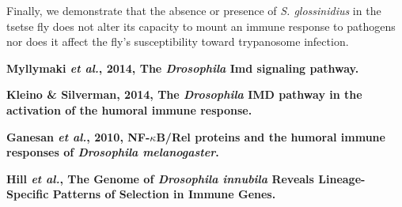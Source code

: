 \documentclass[11pt]{article}
\begin{document}
\begin{sloppypar}
Finally, we demonstrate that the absence or presence of \textit{S. glossinidius} in the tsetse fly does not alter its capacity to mount an immune response to pathogens nor does it affect the fly’s susceptibility toward trypanosome infection.
\par
\textbf{Myllymaki \textit{et al.}, 2014, The \textit{Drosophila} Imd signaling pathway.} \newline
\par
\textbf{Kleino & Silverman, 2014, The \textit{Drosophila} IMD pathway in the activation of the humoral immune response.} \newline
\par
\textbf{Ganesan \textit{et al.}, 2010, NF-$\kappa$B/Rel proteins and the humoral immune responses of \textit{Drosophila melanogaster}.} \newline
\par
\textbf{Hill \textit{et al.}, The Genome of \textit{Drosophila innubila} Reveals Lineage-Specific Patterns of Selection in Immune Genes.} \newline


\end{sloppypar}
\end{document}
